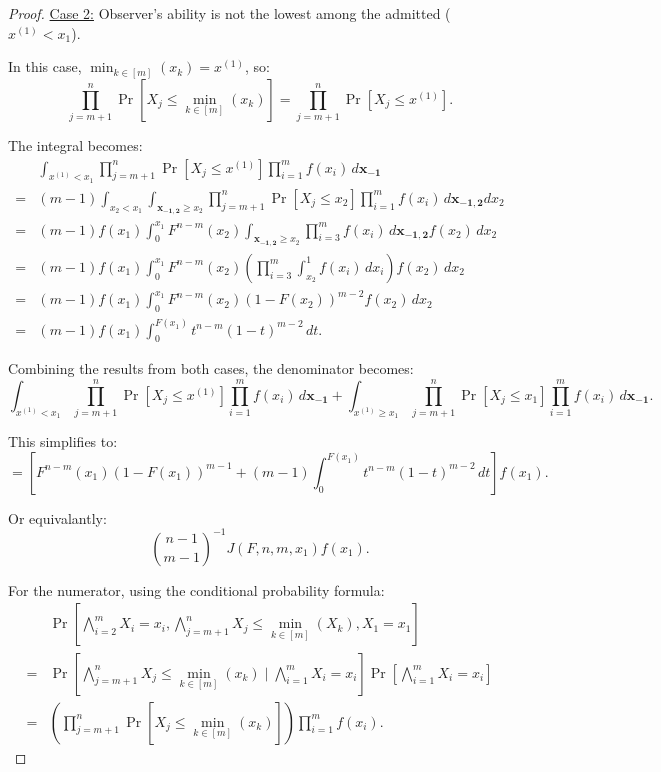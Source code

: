 \begin{proof}
\underline{Case 2:} Observer's ability is not the lowest among the admitted (\(x^{(1)} < x_1\)).

In this case, \(\min_{k \in [m]}(x_k) = x^{(1)}\), so:
\[
\prod_{j=m+1}^n \Pr\left[X_j \leq \min_{k \in [m]}(x_k)\right] = \prod_{j=m+1}^n \Pr\left[X_j \leq x^{(1)}\right].
\]

The integral becomes:
\[
\begin{aligned}
& \int_{x^{(1)} < x_1} \prod_{j=m+1}^n \Pr\left[X_j \leq x^{(1)}\right] \prod_{i=1}^m f(x_i) \, d\mathbf{x_{-1}} \\
= & (m-1) \int_{x_2 < x_1} \int_{\mathbf{x_{-1,2}} \geq x_2} \prod_{j=m+1}^n \Pr\left[X_j \leq x_2\right] \prod_{i=1}^m f(x_i) \, d\mathbf{x_{-1,2}} dx_2 \\
= & (m-1) f(x_1) \int_{0}^{x_1} F^{n-m}(x_2) \int_{\mathbf{x_{-1,2}} \geq x_2} \prod_{i=3}^m f(x_i) \, d\mathbf{x_{-1,2}} f(x_2) \, dx_2 \\
= & (m-1) f(x_1) \int_{0}^{x_1} F^{n-m}(x_2) \left(\prod_{i=3}^m \int_{x_2}^1 f(x_i) \, dx_i\right) f(x_2) \, dx_2 \\
= & (m-1) f(x_1) \int_{0}^{x_1} F^{n-m}(x_2) (1 - F(x_2))^{m-2} f(x_2) \, dx_2 \\
= & (m-1) f(x_1) \int_{0}^{F(x_1)} t^{n-m} (1-t)^{m-2} \, dt.
\end{aligned}
\]

Combining the results from both cases, the denominator becomes:
\[
\int_{x^{(1)} < x_1} \prod_{j=m+1}^n \Pr\left[X_j \leq x^{(1)}\right] \prod_{i=1}^m f(x_i) \, d\mathbf{x_{-1}} + \int_{x^{(1)} \geq x_1} \prod_{j=m+1}^n \Pr\left[X_j \leq x_1\right] \prod_{i=1}^m f(x_i) \, d\mathbf{x_{-1}}.
\]

This simplifies to:
\[
= \left[F^{n-m}(x_1)(1 - F(x_1))^{m-1} + (m-1) \int_{0}^{F(x_1)} t^{n-m} (1-t)^{m-2} \, dt\right] f(x_1).
\]

Or equivalantly:
\[
\binom{n-1}{m-1}^{-1}J(F, n, m, x_1) f(x_1).
\]

For the numerator, using the conditional probability formula:
\[
\begin{aligned}
& \Pr\left[\bigwedge_{i=2}^m X_i = x_i, \bigwedge_{j=m+1}^n X_j \leq \min_{k \in [m]}(X_k), X_1 = x_1\right] \\
= & \Pr\left[\bigwedge_{j=m+1}^n X_j \leq \min_{k \in [m]}(x_k) \mid \bigwedge_{i=1}^m X_i = x_i\right] \Pr\left[\bigwedge_{i=1}^m X_i = x_i\right] \\
= & \left(\prod_{j=m+1}^n \Pr\left[X_j \leq \min_{k \in [m]}(x_k)\right]\right) \prod_{i=1}^m f(x_i).
\end{aligned}
\]


\end{proof}
